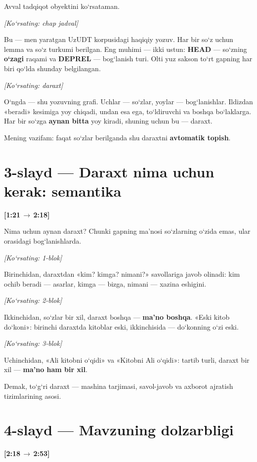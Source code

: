 \documentclass[14pt,a4paper]{extarticle}
\let\origsection\section
\renewcommand{\section}{\Needspace*{9\baselineskip}\origsection}
\newcommand{\timing}[2]{%
   \par\nobreak\noindent\textbf{[#1\,$\to$\,#2]}\par\vspace{0.3em}}
\newcommand{\say}[1]{\textbf{#1}}
\newcommand{\pointto}[1]{\par\vspace{0.3em}\noindent\textit{\small
   [Ko‘rsating: #1]}\par}
\begin{document}
Avval tadqiqot obyektini ko‘rsataman.

\pointto{chap jadval}

Bu --- men yaratgan UzUDT korpusidagi haqiqiy yozuv. Har bir so‘z uchun lemma va
so‘z turkumi berilgan. Eng muhimi --- ikki ustun: \textbf{HEAD} --- so‘zning
\textbf{o‘zagi} raqami va \textbf{DEPREL} --- bog‘lanish turi. Olti yuz sakson to‘rt
gapning har biri qo‘lda shunday belgilangan.

\pointto{daraxt}

O‘ngda --- shu yozuvning grafi. Uchlar --- so‘zlar, yoylar --- bog‘lanishlar.
Ildizdan «beradi» kesimiga yoy chiqadi, undan esa ega, to‘ldiruvchi va boshqa
bo‘laklarga. Har bir so‘zga \textbf{aynan bitta} yoy kiradi, shuning uchun bu ---
daraxt.

Mening vazifam: faqat so‘zlar berilganda shu daraxtni \say{avtomatik topish}.

\section*{3-slayd --- Daraxt nima uchun kerak: semantika}
\timing{1:21}{2:18}

Nima uchun aynan daraxt? Chunki gapning ma’nosi so‘zlarning o‘zida emas, ular
orasidagi bog‘lanishlarda.

\pointto{1-blok}

Birinchidan, daraxtdan «kim? kimga? nimani?» savollariga javob olinadi: kim ochib
beradi --- asarlar, kimga --- bizga, nimani --- xazina eshigini.

\pointto{2-blok}

Ikkinchidan, so‘zlar bir xil, daraxt boshqa --- \textbf{ma’no boshqa}. «Eski kitob
do‘koni»: birinchi daraxtda kitoblar eski, ikkinchisida --- do‘konning o‘zi eski.

\pointto{3-blok}

Uchinchidan, «Ali kitobni o‘qidi» va «Kitobni Ali o‘qidi»: tartib turli, daraxt bir
xil --- \textbf{ma’no ham bir xil}.

Demak, to‘g‘ri daraxt --- mashina tarjimasi, savol-javob va axborot ajratish
tizimlarining asosi.

\section*{4-slayd --- Mavzuning dolzarbligi}
\timing{2:18}{2:53}
\end{document}
